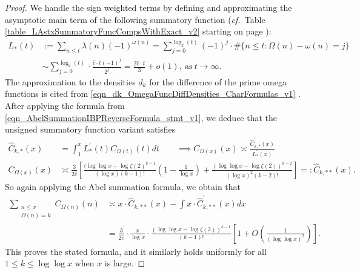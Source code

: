 \documentclass[11pt,reqno,a4letter]{article}
\numberwithin{figure}{section}
\numberwithin{table}{section}
\newcommand{\cf}{\textit{cf.\ }}
\theoremstyle{plain}
\numberwithin{theorem}{section}
\theoremstyle{definition}
\begin{document}
\begin{proof}
We handle the sign weighted terms by defining and approximating the asymptotic main term 
of the following summatory function 
(\cf Table \ref{table_LAstxSummatoryFuncCompsWithExact_v2} starting on page 
\pageref{table_LAstxSummatoryFuncCompsWithExact_v2}): 
\begin{align*} 
L_{\ast}(t) & := \sum_{n \leq t} \lambda(n) (-1)^{\omega(n)} = 
     \sum_{j=0}^{\log_2(t)} (-1)^{j} \cdot \#\{n \leq t: \Omega(n) - \omega(n) = j\} \\ 
     & \sim \sum_{j=0}^{\log_2(t)} \cdot \frac{\hat{c} \cdot t (-1)^{j}}{2^j} = 
     \frac{2\hat{c} \cdot t}{3} + o(1), \mathrm{\ as\ } t \rightarrow \infty. 
\end{align*} 
The approximation to the densities $d_k$ for the difference of the prime omega 
functions is cited from 
\eqref{eqn_dk_OmegaFuncDiffDensities_CharFormulas_v1} \cite[\S 2.4]{MV}. 
After applying the formula from \eqref{eqn_AbelSummationIBPReverseFormula_stmt_v1},  
we deduce that the unsigned summatory function variant satisfies 
\begin{align*} 
\widehat{C}_{k,\ast}(x) & = \int_1^{x} L_{\ast}^{\prime}(t) C_{\Omega(t)}(t) dt \qquad \implies 
C_{\Omega(x)}(x) \asymp \frac{\widehat{C}_{k,\ast}^{\prime}(x)}{L_{\ast}^{\prime}(x)} \\ 
C_{\Omega(x)}(x) & \asymp \frac{3}{2\hat{c}} \left[\frac{(\log\log x - \log\zeta(2)^{k-1}}{(\log x) (k-1)!} \left(1 - 
     \frac{1}{\log x}\right) + \frac{(\log\log x - \log\zeta(2))^{k-2}}{(\log x)^2 (k-2)!}\right] 
     =: \widehat{C}_{k,\ast\ast}(x). 
\end{align*} 
So again applying the Abel summation formula, we obtain that 
\begin{align*} 
\sum_{\substack{n \leq x \\ \Omega(n)=k}} C_{\Omega(n)}(n) & \asymp 
     x \cdot \widehat{C}_{k,\ast\ast}(x) - 
     \int x \cdot \widehat{C}^{\prime}_{k,\ast\ast}(x) dx \\ 
     & = \frac{3}{2\hat{c}} \cdot \frac{x}{\log x} \cdot 
     \frac{(\log\log x - \log\zeta(2))^{k-1}}{(k-1)!} \left[1 + O\left(\frac{1}{(\log\log x)^2}\right) 
     \right]. 
\end{align*} 
This proves the stated formula, and it similarly holds uniformly for all $1 \leq k \leq \log\log x$ 
when $x$ is large. 
\end{proof}
\end{document}
